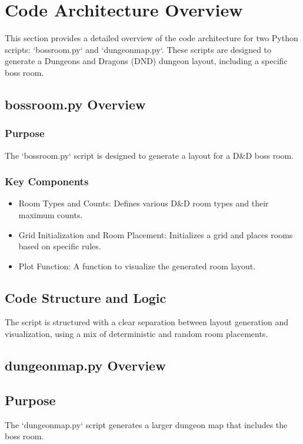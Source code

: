 \documentclass[10pt,twocolumn]{article}
\begin{document}
\section{Code Architecture Overview}

This section provides a detailed overview of the code architecture for two Python scripts: `bossroom.py` and `dungeonmap.py`. These scripts are designed to generate a Dungeons and Dragons (DND) dungeon layout, including a specific boss room.

\subsection{bossroom.py Overview}
\subsubsection{Purpose}
The `bossroom.py` script is designed to generate a layout for a D\&D boss room. 

\subsubsection{Key Components}
\begin{itemize}
    \item Room Types and Counts: Defines various D\&D room types and their maximum counts.
    \item Grid Initialization and Room Placement: Initializes a grid and places rooms based on specific rules.
    \item Plot Function: A function to visualize the generated room layout.
\end{itemize}

\subsection{Code Structure and Logic}
The script is structured with a clear separation between layout generation and visualization, using a mix of deterministic and random room placements.

\subsection{dungeonmap.py Overview}
\subsection{Purpose}
The `dungeonmap.py` script generates a larger dungeon map that includes the boss room.
\end{document}

